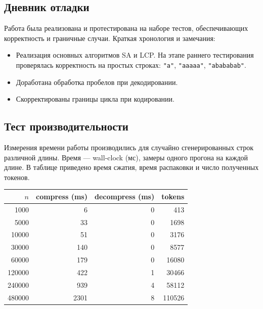 \documentclass[12pt]{article}
\begin{document}
\subsection*{Дневник отладки}

Работа была реализована и протестирована на наборе тестов, обеспечивающих корректность и граничные случаи. Краткая хронология и замечания:
\begin{itemize}
  \item Реализация основных алгоритмов SA и LCP. На этапе раннего тестирования проверялась корректность на простых строках: \texttt{"a"}, \texttt{"aaaaa"}, \texttt{"abababab"}.
  \item Доработана обработка пробелов при декодировании.
  \item Скорректированы границы цикла при кодировании.
\end{itemize}

\subsection*{Тест производительности}

Измерения времени работы производились для случайно сгенерированных строк различной длины. Время — wall-clock (мс), замеры одного прогона на каждой длине. В таблице приведено время сжатия, время распаковки и число полученных токенов.

\begin{center}
\begin{tabular}{r r r r}
\hline
$n$ & compress (ms) & decompress (ms) & tokens \\
\hline
1000 & 6 & 0 & 413 \\
5000 & 33 & 0 & 1698 \\
10000 & 51 & 0 & 3176 \\
30000 & 140 & 0 & 8577 \\
60000 & 179 & 0 & 16080 \\
120000 & 422 & 1 & 30466 \\
240000 & 939 & 4 & 58112 \\
480000 & 2301 & 8 & 110526 \\
\hline
\end{tabular}
\end{center}
\end{document}
